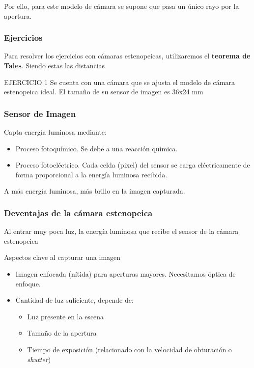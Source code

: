 \documentclass[a4paper]{book}
\begin{document}
Por ello, para este modelo de cámara se supone que pasa un único rayo por la apertura.

\subsubsection{Ejercicios}

Para resolver los ejercicios con cámaras estenopeicas, utilizaremos el \textbf{teorema de Tales}. Siendo estas las distancias

EJERCICIO 1
Se cuenta con una cámara que se ajusta el modelo de cámara estenopeica ideal. El tamaño de su sensor de imagen es 36x24 mm 

\subsubsection{Sensor de Imagen} 

Capta energía luminosa mediante:
\begin{itemize}
	 \item Proceso fotoquímico. Se debe a una reacción química.
	 \item Proceso fotoeléctrico. Cada celda (pixel) del sensor se carga eléctricamente de forma proporcional a la energía luminosa recibida.
\end{itemize}

A más energía luminosa, más brillo en la imagen capturada.

\subsubsection{Deventajas de la cámara estenopeica}

Al entrar muy poca luz, la energía luminosa que recibe el sensor de la cámara estenopeica

Aspectos clave al capturar una imagen
\begin{itemize}
	 \item Imagen enfocada (nítida) para aperturas mayores. Necesitamos óptica de enfoque.
	 \item Cantidad de luz suficiente, depende de:
	 \begin{itemize}
		  \item Luz presente en la escena
		  \item Tamaño de la apertura
		  \item Tiempo de exposición (relacionado con la velocidad de obturación o \textit{shutter})
	 \end{itemize}
\end{itemize}
\end{document}
